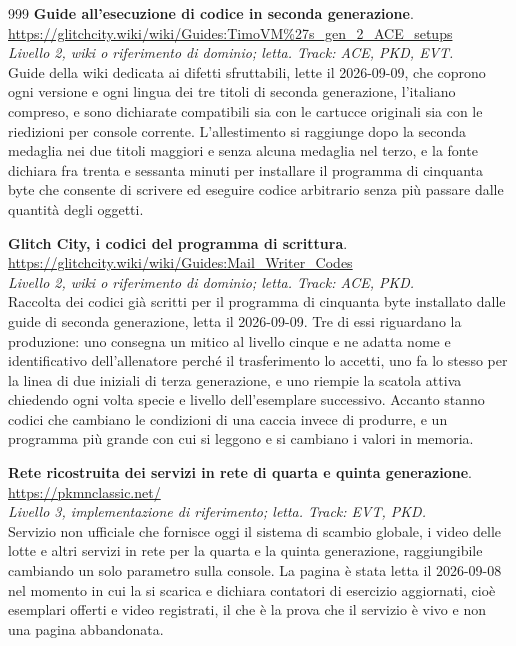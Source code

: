 \begin{thebibliography}{999}
  \textbf{Guide all'esecuzione di codice in seconda generazione}.
  \\ \url{https://glitchcity.wiki/wiki/Guides:TimoVM\%27s_gen_2_ACE_setups}
  \\ \emph{Livello 2, wiki o riferimento di dominio; letta. Track: ACE, PKD, EVT.}
  \\ Guide della wiki dedicata ai difetti sfruttabili, lette il 2026-09-09, che coprono ogni versione e ogni lingua dei tre titoli di seconda generazione, l'italiano compreso, e sono dichiarate compatibili sia con le cartucce originali sia con le riedizioni per console corrente. L'allestimento si raggiunge dopo la seconda medaglia nei due titoli maggiori e senza alcuna medaglia nel terzo, e la fonte dichiara fra trenta e sessanta minuti per installare il programma di cinquanta byte che consente di scrivere ed eseguire codice arbitrario senza più passare dalle quantità degli oggetti.

  \textbf{Glitch City, i codici del programma di scrittura}.
  \\ \url{https://glitchcity.wiki/wiki/Guides:Mail_Writer_Codes}
  \\ \emph{Livello 2, wiki o riferimento di dominio; letta. Track: ACE, PKD.}
  \\ Raccolta dei codici già scritti per il programma di cinquanta byte installato dalle guide di seconda generazione, letta il 2026-09-09. Tre di essi riguardano la produzione: uno consegna un mitico al livello cinque e ne adatta nome e identificativo dell'allenatore perché il trasferimento lo accetti, uno fa lo stesso per la linea di due iniziali di terza generazione, e uno riempie la scatola attiva chiedendo ogni volta specie e livello dell'esemplare successivo. Accanto stanno codici che cambiano le condizioni di una caccia invece di produrre, e un programma più grande con cui si leggono e si cambiano i valori in memoria.

  \textbf{Rete ricostruita dei servizi in rete di quarta e quinta generazione}.
  \\ \url{https://pkmnclassic.net/}
  \\ \emph{Livello 3, implementazione di riferimento; letta. Track: EVT, PKD.}
  \\ Servizio non ufficiale che fornisce oggi il sistema di scambio globale, i video delle lotte e altri servizi in rete per la quarta e la quinta generazione, raggiungibile cambiando un solo parametro sulla console. La pagina è stata letta il 2026-09-08 nel momento in cui la si scarica e dichiara contatori di esercizio aggiornati, cioè esemplari offerti e video registrati, il che è la prova che il servizio è vivo e non una pagina abbandonata.


\end{thebibliography}
